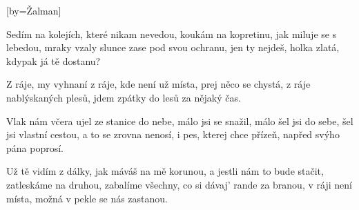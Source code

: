 [by={Žalman}]

\beginverse{}
Sedím na kolejích, které nikam nevedou,  
koukám na kopretinu, jak miluje se s lebedou,  
mraky vzaly slunce zase pod svou ochranu, 
jen ty nejdeš, holka zlatá, kdypak já tě dostanu? 
\endverse{}

\beginchorus{}
Z ráje, my vyhnaní z ráje,
kde není už místa, prej něco se chystá, 
z ráje nablýskaných plesů,
jdem zpátky do lesů za nějaký čas.
\endchorus{}

\beginverse{}
Vlak nám včera ujel ze stanice do nebe,
málo jsi se snažil, málo šel jsi do sebe,
šel jsi vlastní cestou, a to se zrovna nenosí, 
i pes, kterej chce přízeň, napřed svýho pána poprosí. 
\endverse{}

\beginchorus{}

\endchorus{}

\beginverse{}
Už tě vidím z dálky, jak máváš na mě korunou,
a jestli nám to bude stačit, zatleskáme na druhou,
zabalíme všechny, co si dávaj' rande za branou, 
v ráji není místa, možná v pekle se nás zastanou. 
\endverse{}

\beginchorus{}

\endchorus{}

\endsong{}
